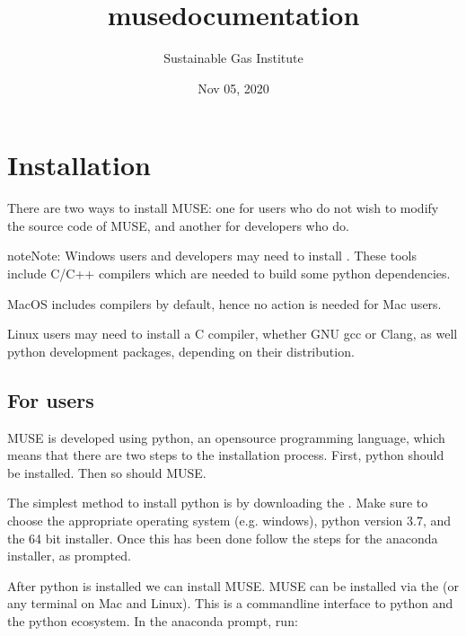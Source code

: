 \documentclass[letterpaper,10pt,english]{sphinxmanual}
\title{muse\sphinxhyphen{}documentation}
\date{Nov 05, 2020}
\author{Sustainable Gas Institute}
\begin{document}
\pagestyle{empty}
\sphinxmaketitle
\pagestyle{plain}
\sphinxtableofcontents
\pagestyle{normal}
\label{\detokenize{index::doc}}



\chapter{Installation}
\label{\detokenize{installing-muse:installation}}\label{\detokenize{installing-muse::doc}}
There are two ways to install MUSE: one for users who do not wish to modify the source code of MUSE, and another for developers who do.

\begin{sphinxadmonition}{note}{Note:}
Windows users and developers may need to install . These tools include C/C++ compilers which are needed to build some python dependencies.

MacOS includes compilers by default, hence no action is needed for Mac users.

Linux users may need to install a C compiler, whether GNU gcc or Clang, as well python development packages, depending on their distribution.
\end{sphinxadmonition}


\section{For users}
\label{\detokenize{installing-muse:for-users}}
MUSE is developed using python, an open\sphinxhyphen{}source programming language, which means that there are two steps to the installation process. First, python should be installed. Then so should MUSE.

The simplest method to install python is by downloading the . Make sure to choose the appropriate operating system (e.g. windows), python version 3.7, and the 64 bit installer. Once this has been done follow the steps for the anaconda installer, as prompted.

After python is installed we can install MUSE. MUSE can be installed via the  (or any terminal on Mac and Linux). This is a command\sphinxhyphen{}line interface to python and the python eco\sphinxhyphen{}system. In the anaconda prompt, run:
\end{document}

